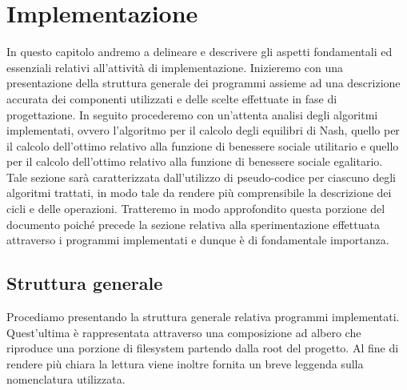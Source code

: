 \chapter{Implementazione}
\justify
In questo capitolo andremo a delineare e descrivere gli aspetti fondamentali ed essenziali relativi all'attività di implementazione. Inizieremo con una presentazione della struttura generale dei programmi assieme ad una descrizione accurata dei componenti utilizzati e delle scelte effettuate in fase di progettazione. In seguito procederemo con un'attenta analisi degli algoritmi implementati, ovvero l'algoritmo per il calcolo degli equilibri di Nash, quello per il calcolo dell'ottimo relativo alla funzione di benessere sociale utilitario e quello per il calcolo dell'ottimo relativo alla funzione di benessere sociale egalitario.\\
Tale sezione sarà caratterizzata dall'utilizzo di pseudo-codice per ciascuno degli algoritmi trattati, in modo tale da rendere più comprensibile la descrizione dei cicli e delle operazioni. Tratteremo in modo approfondito questa porzione del documento poiché precede la sezione relativa alla sperimentazione effettuata attraverso i programmi implementati e dunque è di fondamentale importanza.\\

\section{Struttura generale}
\justify
Procediamo presentando la struttura generale relativa programmi implementati. Quest'ultima è rappresentata attraverso una composizione ad albero che riproduce una porzione di filesystem partendo dalla root del progetto. Al fine di rendere più chiara la lettura viene inoltre fornita un breve leggenda sulla nomenclatura utilizzata.

